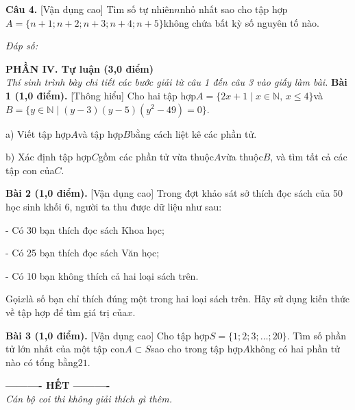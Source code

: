 \documentclass[11pt,a4paper]{article}
\begin{document}
\noindent\textbf{Câu 4.} [Vận dụng cao] Tìm số tự nhiên$n$nhỏ nhất sao cho tập hợp$A = \{n + 1; n + 2; n + 3; n + 4; n + 5\}$không chứa bất kỳ số nguyên tố nào.\par\vspace{2pt}
\noindent\textit{Đáp số:} \dotfill\par\vspace{6pt}


\vspace{6pt}
\noindent
\textbf{\large PHẦN IV. Tự luận (3,0 điểm)}\\
\textit{\small Thí sinh trình bày chi tiết các bước giải từ câu 1 đến câu 3 vào giấy làm bài.}
\vspace{6pt}
\noindent\textbf{Bài 1 (1,0 điểm).} [Thông hiểu] Cho hai tập hợp$A = \{2x + 1 \mid x \in \mathbb{N},\, x \le 4\}$và$B = \{y \in \mathbb{N} \mid (y - 3)(y - 5)(y^2 - 49) = 0\}$.\par\noindent a) Viết tập hợp$A$và tập hợp$B$bằng cách liệt kê các phần tử.\par\noindent b) Xác định tập hợp$C$gồm các phần tử vừa thuộc$A$vừa thuộc$B$, và tìm tất cả các tập con của$C$.\par\vspace{8pt}

\noindent\textbf{Bài 2 (1,0 điểm).} [Vận dụng cao] Trong đợt khảo sát sở thích đọc sách của 50 học sinh khối 6, người ta thu được dữ liệu như sau:\par\noindent - Có 30 bạn thích đọc sách Khoa học;\par\noindent - Có 25 bạn thích đọc sách Văn học;\par\noindent - Có 10 bạn không thích cả hai loại sách trên.\par\noindent Gọi$x$là số bạn chỉ thích đúng một trong hai loại sách trên. Hãy sử dụng kiến thức về tập hợp để tìm giá trị của$x$.\par\vspace{8pt}

\noindent\textbf{Bài 3 (1,0 điểm).} [Vận dụng cao] Cho tập hợp$S = \{1; 2; 3; \dots; 20\}$. Tìm số phần tử lớn nhất của một tập con$A \subset S$sao cho trong tập hợp$A$không có hai phần tử nào có tổng bằng$21$.\par\vspace{8pt}


\begin{center}
\textbf{---------- HẾT ----------}\\
\textit{\small Cán bộ coi thi không giải thích gì thêm.}
\end{center}
\end{document}
